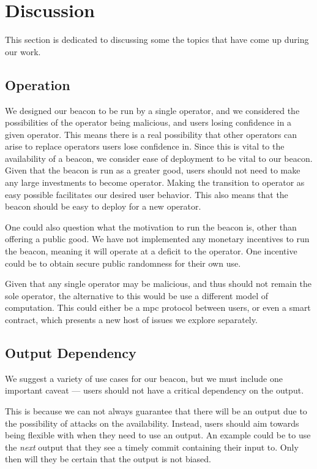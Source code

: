 \section{Discussion}%
\label{sec:discussion}
This section is dedicated to discussing some the topics that have come up during our work.
\subsection{Operation}
We designed our beacon to be run by a single operator, and we considered the possibilities of the operator being malicious, and users losing confidence in a given operator.
This means there is a real possibility that other operators can arise to replace operators users lose confidence in. Since this is vital to the availability of a beacon, we consider ease of deployment to be vital to our beacon. Given that the beacon is run as a greater good, users should not need to make any large investments to become operator. Making the transition to operator as easy possible facilitates our desired user behavior. This also means that the beacon should be easy to deploy for a new operator.

One could also question what the motivation to run the beacon is, other than offering a public good. We have not implemented any monetary incentives to run the beacon, meaning it will operate at a deficit to the operator. One incentive could be to obtain secure public randomness for their own use.

Given that any single operator may be malicious, and thus should not remain the sole operator, the alternative to this would be use a different model of computation. This could either be a \acrshort{mpc} protocol between users, or even a smart contract, which presents a new host of issues we explore separately.

\subsection{Output Dependency}
We suggest a variety of use cases for our beacon, but we must include one important caveat --- users should not have a critical dependency on the output.

This is because we can not always guarantee that there will be an output due to the possibility of attacks on the availability.
Instead, users should aim towards being flexible with when they need to use an output. An example could be to use the \textit{next} output that they see a timely commit containing their input to. Only then will they be certain that the output is not biased.

